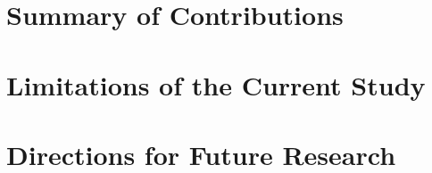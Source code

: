 \section{Summary of Contributions}

\section{Limitations of the Current Study}

\section{Directions for Future Research}